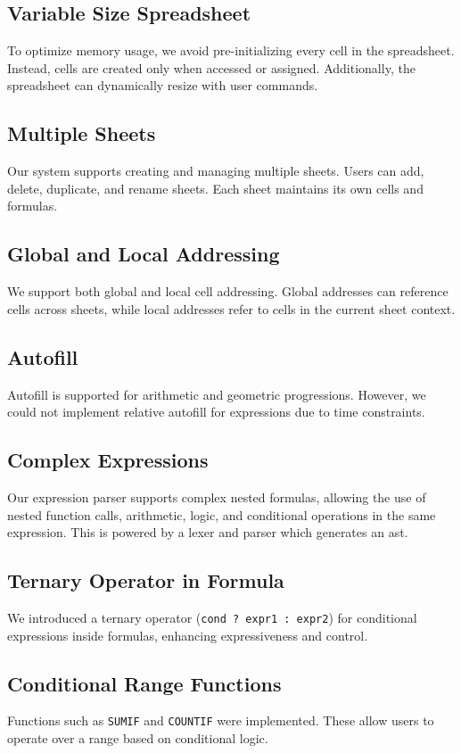\documentclass{article}
\begin{document}
\subsection{Variable Size Spreadsheet}
To optimize memory usage, we avoid pre-initializing every cell in the spreadsheet. Instead, cells are created only when accessed or assigned. Additionally, the spreadsheet can dynamically resize with user commands.

\subsection{Multiple Sheets}
Our system supports creating and managing multiple sheets. Users can add, delete, duplicate, and rename sheets. Each sheet maintains its own cells and formulas.

\subsection{Global and Local Addressing}
We support both global and local cell addressing. Global addresses can reference cells across sheets, while local addresses refer to cells in the current sheet context.

\subsection{Autofill}
Autofill is supported for arithmetic and geometric progressions. However, we could not implement relative autofill for expressions due to time constraints.

\subsection{Complex Expressions}
Our expression parser supports complex nested formulas, allowing the use of nested function calls, arithmetic, logic, and conditional operations in the same expression. This is powered by a lexer and parser which generates an ast.

\subsection{Ternary Operator in Formula}
We introduced a ternary operator (\texttt{cond ? expr1 : expr2}) for conditional expressions inside formulas, enhancing expressiveness and control.

\subsection{Conditional Range Functions}
Functions such as \texttt{SUMIF} and \texttt{COUNTIF} were implemented. These allow users to operate over a range based on conditional logic.
\end{document}

